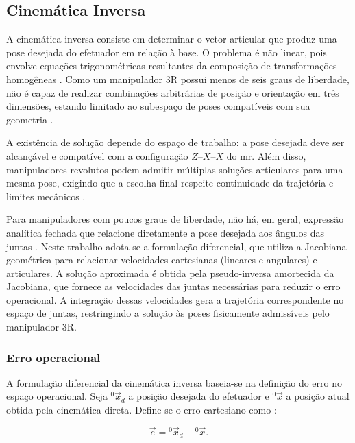 \subsection{Cinemática Inversa}
\label{sec:cinematica_inversa}

A cinemática inversa consiste em determinar o vetor articular que produz uma pose desejada do efetuador em relação à base.
O problema é não linear, pois envolve equações trigonométricas resultantes da composição de transformações homogêneas \cite{craig2005,spong2006robot}.
Como um manipulador 3R possui menos de seis graus de liberdade, não é capaz de realizar combinações arbitrárias de posição e orientação em três dimensões, estando limitado ao subespaço de poses compatíveis com sua geometria \cite{craig2005}.

A existência de solução depende do espaço de trabalho: a pose desejada deve ser alcançável e compatível com a configuração $Z$--$X$--$X$ do \gls{mr}.
Além disso, manipuladores revolutos podem admitir múltiplas soluções articulares para uma mesma pose, exigindo que a escolha final respeite continuidade da trajetória e limites mecânicos \cite{craig2005}.

Para manipuladores com poucos graus de liberdade, não há, em geral, expressão analítica fechada que relacione diretamente a pose desejada aos ângulos das juntas \cite{sciavicco_siciliano2010}.
Neste trabalho adota-se a formulação diferencial, que utiliza a Jacobiana geométrica para relacionar velocidades cartesianas (lineares e angulares) e articulares.
A solução aproximada é obtida pela pseudo-inversa amortecida da Jacobiana, que fornece as velocidades das juntas necessárias para reduzir o erro operacional.
A integração dessas velocidades gera a trajetória correspondente no espaço de juntas, restringindo a solução às poses fisicamente admissíveis pelo manipulador 3R.

\subsubsection{Erro operacional}

A formulação diferencial da cinemática inversa baseia-se na definição do erro no espaço operacional. Seja ${}^{0}\!\vec{x}_{d}$ a posição desejada do efetuador e ${}^{0}\!\vec{x}$ a posição atual obtida pela cinemática direta. Define-se o erro cartesiano como \cite{sciavicco_siciliano2010}:

\begin{equation}
\label{eq:erro_operacional}
\vec{e}
=
{}^{0}\!\vec{x}_{d}
-
{}^{0}\!\vec{x}.
\end{equation}

